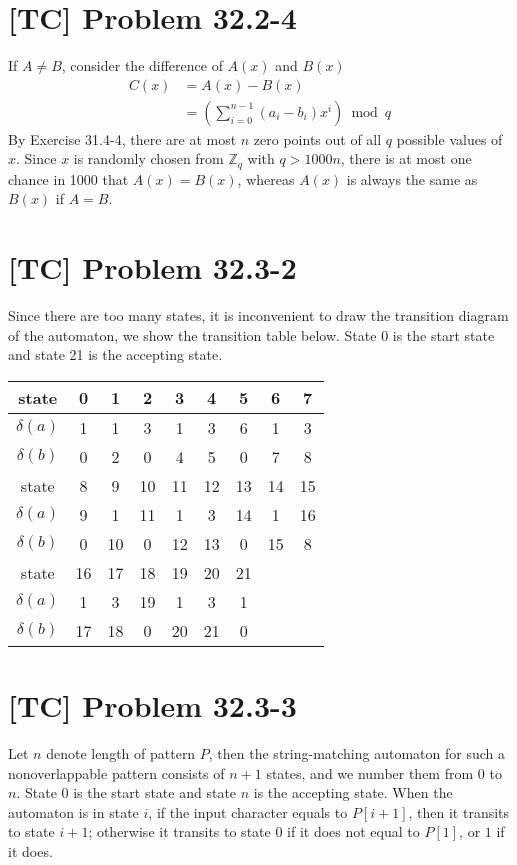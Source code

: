 \documentclass[a4paper,11pt,twocolumn]{article}
\begin{document}
  \section{[TC] Problem 32.2-4}
  If $A \neq B$, consider the difference of $A(x)$ and $B(x)$
  \begin{align*}
    C(x) &= A(x) - B(x) \\
    &= \left(\sum_{i=0}^{n-1}(a_i-b_i)x^i \right) \bmod q
  \end{align*}
  By Exercise 31.4-4, there are at most $n$ zero points out of all $q$ possible values of $x$. Since $x$ is randomly chosen from $\mathbb{Z}_q$ with $q > 1000n$, there is at most one chance in 1000 that $A(x) = B(x)$, whereas $A(x)$ is always the same as $B(x)$ if $A = B$.

  \section{[TC] Problem 32.3-2}
  Since there are too many states, it is inconvenient to draw the transition diagram of the automaton, we show the transition table below. State 0 is the start state and state 21 is the accepting state.
  \begin{table}[h]
    \begin{tabular}{c|cccccccc}
      \hline
      state & 0 & 1 & 2 & 3 & 4 & 5 & 6 & 7 \\ \hline
      $\delta(a)$ & 1 & 1 & 3 & 1 & 3 & 6 & 1 & 3 \\
      $\delta(b)$ & 0 & 2 & 0 & 4 & 5 & 0 & 7 & 8 \\ \hline
      state & 8 & 9 & 10 & 11 & 12 & 13 & 14 & 15 \\ \hline
      $\delta(a)$ & 9 & 1 & 11 & 1 & 3 & 14 & 1 & 16 \\
      $\delta(b)$ & 0 & 10 & 0 & 12 & 13 & 0 & 15 & 8 \\ \hline
      state & 16 & 17 & 18 & 19 & 20 & 21  \\ \hline
      $\delta(a)$ & 1 & 3 & 19 & 1 & 3 & 1 \\
      $\delta(b)$ & 17 & 18 & 0 & 20 & 21 & 0 \\
      \hline
    \end{tabular}
  \end{table}

  \section{[TC] Problem 32.3-3}
  Let $n$ denote length of pattern $P$, then the string-matching automaton for such a nonoverlappable pattern consists of $n+1$ states, and we number them from 0 to $n$. State 0 is the start state and state $n$ is the accepting state. When the automaton is in state $i$, if the input character equals to $P[i+1]$, then it transits to state $i+1$; otherwise it transits to state $0$ if it does not equal to $P[1]$, or $1$ if it does.
\end{document}

